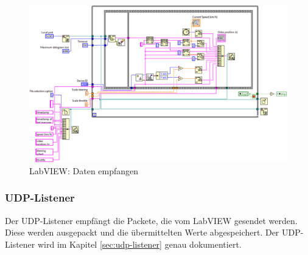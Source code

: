 \newpage

\begin{figure}[H]
\centering 
\includegraphics[angle=90,width=0.9\linewidth]{src/labview_screenshot_videoplayer_daten_empfangen.png}
\caption{LabVIEW: Daten empfangen} %
\label{labview_screenshot_videoplayer_daten_empfangen} %
\end{figure}

\newpage

\subsubsection{UDP-Listener}
Der UDP-Listener empfängt die Packete, die vom LabVIEW gesendet werden. Diese werden ausgepackt und die übermittelten Werte abgespeichert. Der UDP-Listener wird im Kapitel \ref{sec:udp-listener} genau dokumentiert. 
